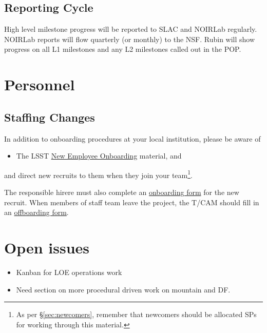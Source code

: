 \subsection{Reporting Cycle}
 
High level milestone progress will be reported to SLAC and NOIRLab regularly. 
NOIRLab reports will flow quarterly (or monthly) to the NSF. 
Rubin will show progress on all L1 milestones and any L2 milestones called out in the POP. 


\section{Personnel}

\subsection{Staffing Changes}
\label{sec:staffing}

In addition to onboarding procedures at your local institution, please
be aware of

\begin{itemize}
\item
  The \gls{LSST} \href{https://project.lsst.org/onboarding}{New Employee
  Onboarding} material, and
\end{itemize}

and direct new recruits to them when they join your team\footnote{As per \S\ref{sec:newcomers}, remember that newcomers should be allocated \glspl{SP} for working through this material.}.

The responsible hirere must also complete an \href{https://project.lsst.org/onboarding/form}{onboarding form} for the new recruit.
When members of staff team leave the project, the \gls{T/CAM} should fill in an \href{https://project.lsst.org/onboarding/offboarding_form}{offboarding form}.


\section{Open issues}

\begin{itemize}
\item Kanban for \gls{LOE} operations work
\item Need section on more procedural driven work on mountain and DF.
\end{itemize}

